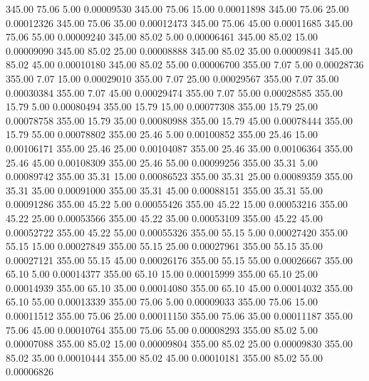     345.00     75.06      5.00     0.00009530
    345.00     75.06     15.00     0.00011898
    345.00     75.06     25.00     0.00012326
    345.00     75.06     35.00     0.00012473
    345.00     75.06     45.00     0.00011685
    345.00     75.06     55.00     0.00009240
    345.00     85.02      5.00     0.00006461
    345.00     85.02     15.00     0.00009090
    345.00     85.02     25.00     0.00008888
    345.00     85.02     35.00     0.00009841
    345.00     85.02     45.00     0.00010180
    345.00     85.02     55.00     0.00006700
    355.00      7.07      5.00     0.00028736
    355.00      7.07     15.00     0.00029010
    355.00      7.07     25.00     0.00029567
    355.00      7.07     35.00     0.00030384
    355.00      7.07     45.00     0.00029474
    355.00      7.07     55.00     0.00028585
    355.00     15.79      5.00     0.00080494
    355.00     15.79     15.00     0.00077308
    355.00     15.79     25.00     0.00078758
    355.00     15.79     35.00     0.00080988
    355.00     15.79     45.00     0.00078444
    355.00     15.79     55.00     0.00078802
    355.00     25.46      5.00     0.00100852
    355.00     25.46     15.00     0.00106171
    355.00     25.46     25.00     0.00104087
    355.00     25.46     35.00     0.00106364
    355.00     25.46     45.00     0.00108309
    355.00     25.46     55.00     0.00099256
    355.00     35.31      5.00     0.00089742
    355.00     35.31     15.00     0.00086523
    355.00     35.31     25.00     0.00089359
    355.00     35.31     35.00     0.00091000
    355.00     35.31     45.00     0.00088151
    355.00     35.31     55.00     0.00091286
    355.00     45.22      5.00     0.00055426
    355.00     45.22     15.00     0.00053216
    355.00     45.22     25.00     0.00053566
    355.00     45.22     35.00     0.00053109
    355.00     45.22     45.00     0.00052722
    355.00     45.22     55.00     0.00055326
    355.00     55.15      5.00     0.00027420
    355.00     55.15     15.00     0.00027849
    355.00     55.15     25.00     0.00027961
    355.00     55.15     35.00     0.00027121
    355.00     55.15     45.00     0.00026176
    355.00     55.15     55.00     0.00026667
    355.00     65.10      5.00     0.00014377
    355.00     65.10     15.00     0.00015999
    355.00     65.10     25.00     0.00014939
    355.00     65.10     35.00     0.00014080
    355.00     65.10     45.00     0.00014032
    355.00     65.10     55.00     0.00013339
    355.00     75.06      5.00     0.00009033
    355.00     75.06     15.00     0.00011512
    355.00     75.06     25.00     0.00011150
    355.00     75.06     35.00     0.00011187
    355.00     75.06     45.00     0.00010764
    355.00     75.06     55.00     0.00008293
    355.00     85.02      5.00     0.00007088
    355.00     85.02     15.00     0.00009804
    355.00     85.02     25.00     0.00009830
    355.00     85.02     35.00     0.00010444
    355.00     85.02     45.00     0.00010181
    355.00     85.02     55.00     0.00006826
